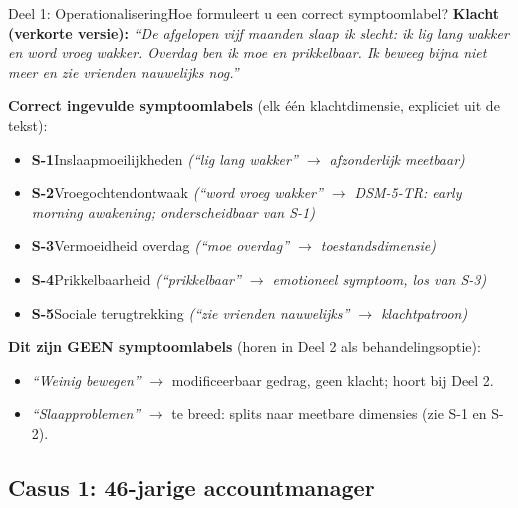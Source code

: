 \documentclass[11pt,a4paper]{article}
\begin{document}
\begin{voorbeeldbox}{Deel 1: Operationalisering}{Hoe formuleert u een correct symptoomlabel?}
\small
\textbf{Klacht (verkorte versie):} \textit{``De afgelopen vijf maanden slaap ik slecht:
ik lig lang wakker en word vroeg wakker. Overdag ben ik moe en prikkelbaar. Ik beweeg
bijna niet meer en zie vrienden nauwelijks nog.''}

\medskip
\textbf{Correct ingevulde symptoomlabels} (elk één klachtdimensie, expliciet uit de tekst):
\begin{itemize}[topsep=2pt,itemsep=1pt]
\item \textbf{S-1}\enspace Inslaapmoeilijkheden
  \hfill\textit{(``lig lang wakker'' $\rightarrow$ afzonderlijk meetbaar)}
\item \textbf{S-2}\enspace Vroegochtendontwaak
  \hfill\textit{(``word vroeg wakker'' $\rightarrow$ DSM-5-TR: early morning awakening; onderscheidbaar van S-1)}
\item \textbf{S-3}\enspace Vermoeidheid overdag
  \hfill\textit{(``moe overdag'' $\rightarrow$ toestandsdimensie)}
\item \textbf{S-4}\enspace Prikkelbaarheid
  \hfill\textit{(``prikkelbaar'' $\rightarrow$ emotioneel symptoom, los van S-3)}
\item \textbf{S-5}\enspace Sociale terugtrekking
  \hfill\textit{(``zie vrienden nauwelijks'' $\rightarrow$ klachtpatroon)}
\end{itemize}

\medskip
\textbf{\color{StrongRed}Dit zijn GEEN symptoomlabels} (horen in Deel 2 als behandelingsoptie):
\begin{itemize}[topsep=1pt,itemsep=0pt]
\item \textit{``Weinig bewegen''} $\rightarrow$ modificeerbaar gedrag, geen klacht; hoort bij Deel 2.
\item \textit{``Slaapproblemen''} $\rightarrow$ te breed: splits naar meetbare dimensies (zie S-1 en S-2).
\end{itemize}
\end{voorbeeldbox}

\vspace{0.5em}

\newpage

\subsection*{Casus 1: 46-jarige accountmanager}
\end{document}
